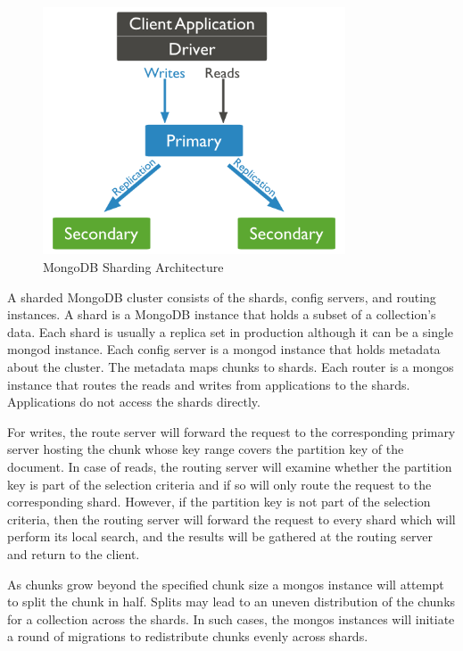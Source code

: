 \documentclass[11pt]{book}
\begin{document}
\begin{figure}[t]
\includegraphics[width=0.8\textwidth]{images/mongodb-replica-set.png}
\centering
\caption{MongoDB Sharding Architecture}
\end{figure}

A sharded MongoDB cluster consists of the shards, config servers, and routing instances. A shard is a MongoDB instance that holds a subset of a collection's data. Each shard is usually a replica set in production although it can be a single mongod instance. Each config server is a mongod instance that holds metadata about the cluster. The metadata maps chunks to shards. Each router is a mongos instance that routes the reads and writes from applications to the shards. Applications do not access the shards directly.

For writes, the route server will forward the request to the corresponding primary server hosting the chunk whose key range covers the partition key of the document. In case of reads, the routing server will examine whether the partition key is part of the selection criteria and if so will only route the request to the corresponding shard. However, if the partition key is not part of the selection criteria, then the routing server will forward the request to every shard which will perform its local search, and the results will be gathered at the routing server and return to the client.

As chunks grow beyond the specified chunk size a mongos instance will attempt to split the chunk in half. Splits may lead to an uneven distribution of the chunks for a collection across the shards. In such cases, the mongos instances will initiate a round of migrations to redistribute chunks evenly across shards.
\end{document}
